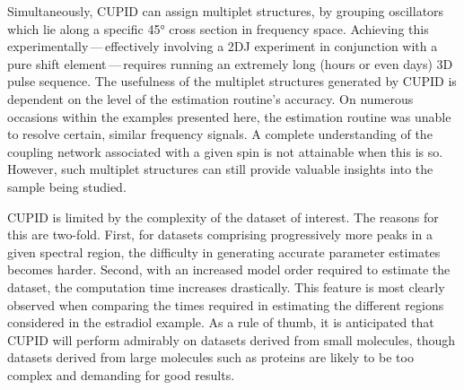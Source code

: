 Simultaneously, \ac{CUPID} can assign multiplet structures,
by grouping oscillators which lie along a specific \ang{45} cross section in
frequency space. Achieving this experimentally\,---\,effectively involving
a \ac{2DJ} experiment in conjunction with a pure shift element\,---\,requires
running an extremely long (hours or even days) \ac{3D} pulse sequence. The
usefulness of the multiplet structures generated by \ac{CUPID} is dependent on
the level of the estimation routine's accuracy. On
numerous occasions within the examples presented here, the estimation routine
was unable to resolve certain, similar frequency signals. A complete
understanding of the coupling network associated with a given spin is not
attainable when this is so. However, such multiplet structures can still provide
valuable insights into the sample being studied.

\ac{CUPID} is limited by the complexity of the dataset of interest. The reasons
for this are two-fold. First, for datasets comprising progressively more peaks
in a given spectral region, the difficulty in generating accurate parameter
estimates becomes harder. Second, with an increased model order required to
estimate the dataset, the computation time increases drastically.
This feature is most clearly observed when comparing the times required in
estimating the different regions considered in the estradiol example. As a rule
of thumb, it is anticipated that \ac{CUPID} will perform admirably on datasets
derived from small molecules, though datasets derived from large molecules such
as proteins are likely to be too complex and demanding for good results.

